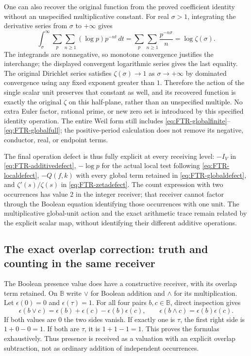One can also recover the original function from the proved
coefficient identity without an unspecified multiplicative
constant. For real $\sigma>1$, integrating the derivative series
from $\sigma$ to $+\infty$ gives
\begin{equation}\tag{FTR27}\label{eq:FTR-zetarecovery}
 \int_\sigma^\infty
      \sum_p\sum_{n\geq1}(\log p)p^{-nt}\,dt
    =\sum_p\sum_{n\geq1}\frac{p^{-n\sigma}}n
    =\log\zeta(\sigma).
\end{equation}
The integrands are nonnegative, so monotone convergence
justifies the interchange; the displayed convergent logarithmic
series gives the last equality. The original Dirichlet series
satisfies $\zeta(\sigma)\to1$ as $\sigma\to+\infty$ by
dominated convergence using any fixed exponent greater than
$1$. Therefore the action of the single scalar unit preserves
that constant as well, and its recovered function is exactly
the original $\zeta$ on this half-plane, rather than an
unspecified multiple. No extra Euler factor, rational prime,
or new zero set is introduced by this specified identity
operation. The entire Weil form still includes
\eqref{eq:FTR-globalfinite}--\eqref{eq:FTR-globalfull}; the
positive-period calculation does not remove its negative,
conductor, real, or endpoint terms.

The final operation defect is thus fully explicit at every
receiving level: $-I_V$ in \eqref{eq:FTR-additivedefect},
$-\log p$ for the actual local test following
\eqref{eq:FTR-localdefect}, $-Q(f,k)$ with every global term
retained in \eqref{eq:FTR-globaldefect}, and
$\zeta'(s)/\zeta(s)$ in \eqref{eq:FTR-zetadefect}.
The count expression with two occurrences has value $2$ in
the integer receiver; that receiver cannot factor through
the Boolean equation identifying those occurrences with one
unit. The multiplicative global-unit action and the exact
arithmetic trace remain related by the explicit scalar map,
without identifying their different additive operations.

\subsection{The exact overlap correction: truth and counting in the same receiver}

The Boolean presence value does have a constructive receiver,
with its overlap term retained. On $\mathbb B$ write $\vee$
for Boolean addition and $\wedge$ for its multiplication.
Let $\epsilon(0)=0$ and $\epsilon(\tau)=1$. For all four
pairs $b,c\in\mathbb B$, direct inspection gives
\begin{equation}\tag{FTR28}\label{eq:FTR-overlapscalar}
 \epsilon(b\vee c)=\epsilon(b)+\epsilon(c)
                       -\epsilon(b)\epsilon(c),\qquad
 \epsilon(b\wedge c)=\epsilon(b)\epsilon(c).
\end{equation}
If both values are $0$ the two sides vanish. If exactly one
is $\tau$, the first right side is $1+0-0=1$.
If both are $\tau$, it is $1+1-1=1$.
This proves the formulas exhaustively. Thus presence is received
as a valuation with an explicit overlap subtraction, not as
ordinary addition of independent occurrences.

